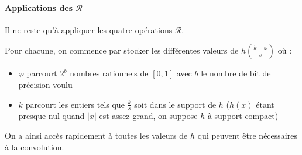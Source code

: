 	\paragraph{Applications des $\mathcal R$}
		
		Il ne reste qu'à appliquer les quatre opérations $\mathcal R$.
		
		Pour chacune, on commence par stocker les différentes valeurs de $h(\frac{k+\varphi}{s})$ où :
		\begin{itemize}
		\item $\varphi$ parcourt $2^b$ nombres rationnels de $[0,1]$ avec $b$ le nombre de bit de précision voulu
		\item $k$ parcourt les entiers tels que $\frac{k}{s}$ soit dans le support de $h$ ($h(x)$ étant presque nul quand $|x|$ est assez grand, on suppose $h$ à support compact)
		\end{itemize}
		On a ainsi accès rapidement à toutes les valeurs de $h$ qui peuvent être nécessaires à la convolution.
